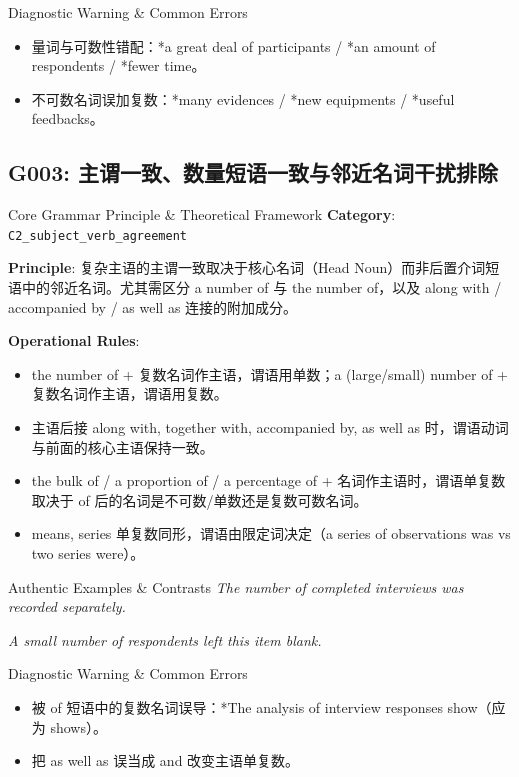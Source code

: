 \begin{TipBox}{Diagnostic Warning \& Common Errors}
\begin{itemize}[leftmargin=1.5em, itemsep=1pt]
  \item 量词与可数性错配：*a great deal of participants / *an amount of respondents / *fewer time。
  \item 不可数名词误加复数：*many evidences / *new equipments / *useful feedbacks。
\end{itemize}
\end{TipBox}
\vspace{6pt}
\subsection{G003: 主谓一致、数量短语一致与邻近名词干扰排除}\label{sec:rule:G003}
\begin{ConceptBox}{Core Grammar Principle \& Theoretical Framework}
\textbf{Category}: \texttt{C2\_subject\_verb\_agreement}\par\vspace{3pt}
\textbf{Principle}: 复杂主语的主谓一致取决于核心名词（Head Noun）而非后置介词短语中的邻近名词。尤其需区分 a number of 与 the number of，以及 along with / accompanied by / as well as 连接的附加成分。\par\vspace{4pt}
\textbf{Operational Rules}:
\begin{itemize}[leftmargin=1.5em, itemsep=1pt]
  \item the number of + 复数名词作主语，谓语用单数；a (large/small) number of + 复数名词作主语，谓语用复数。
  \item 主语后接 along with, together with, accompanied by, as well as 时，谓语动词与前面的核心主语保持一致。
  \item the bulk of / a proportion of / a percentage of + 名词作主语时，谓语单复数取决于 of 后的名词是不可数/单数还是复数可数名词。
  \item means, series 单复数同形，谓语由限定词决定（a series of observations was vs two series were）。
\end{itemize}
\end{ConceptBox}
\begin{ExampleBox}{Authentic Examples \& Contrasts}
\textit{The number of completed interviews was recorded separately.}\par\vspace{2pt}
\textit{A small number of respondents left this item blank.}\par\vspace{2pt}
\end{ExampleBox}
\begin{TipBox}{Diagnostic Warning \& Common Errors}
\begin{itemize}[leftmargin=1.5em, itemsep=1pt]
  \item 被 of 短语中的复数名词误导：*The analysis of interview responses show（应为 shows）。
  \item 把 as well as 误当成 and 改变主语单复数。
\end{itemize}
\end{TipBox}
\vspace{6pt}
